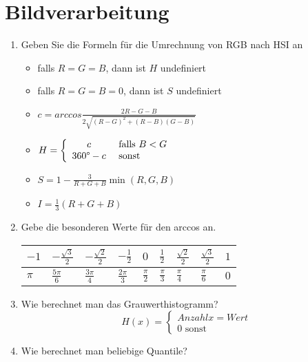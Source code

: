 \section{Bildverarbeitung}
\begin{enumerate}
	\item Geben Sie die Formeln für die Umrechnung von RGB nach HSI an
	\begin{itemize}
		\item falls $R=G=B$, dann ist $H$ undefiniert
		\item falls $R=G=B=0$, dann ist $S$ undefiniert
		\item $c = arccos  \frac{2R - G - B}{2 \sqrt{(R-G)^2 + (R-B)(G-B)}}$
		\item $H = \left\{ \begin{array}{cl} c & \textrm{ falls } B < G \\ 360\degree - c & \textrm{ sonst} \end{array} \right.$
		\item $S = 1 - \frac{3}{R+G+B} \min (R,G,B)$
		\item $I = \frac{1}{3} (R + G + B)$
	\end{itemize}
	\item Gebe die besonderen Werte für den arccos an.
		\begin{center}
  \begin{tabular}{ l | l | l | l | l | l | l | l | l}
    \hline
    $-1$ & $-\frac{\sqrt{3}}{2}$ & $-\frac{\sqrt{2}}{2}$ & $-\frac{1}{2}$ & $0$ & $\frac{1}{2}$ & $\frac{\sqrt{2}}{2}$ & $\frac{\sqrt{3}}{2}$ & $1$ \\ \hline
    $\pi$ & $\frac{5\pi}{6}$ & $\frac{3\pi}{4}$ & $\frac{2\pi}{3}$ & $\frac{\pi}{2}$ &  $\frac{\pi}{3}$ &  $\frac{\pi}{4}$ &  $\frac{\pi}{6}$ & $0$ \\
		\hline
  \end{tabular}
\end{center}
	\item Wie berechnet man das Grauwerthistogramm?
	\begin{equation}
	H(x)= \left\{ \begin{array}{cl} Anzahl x=Wert \\ 0 \textrm{ sonst} \end{array} \right.
	\end{equation}
	\item Wie berechnet man beliebige Quantile?
	

\end{enumerate}
